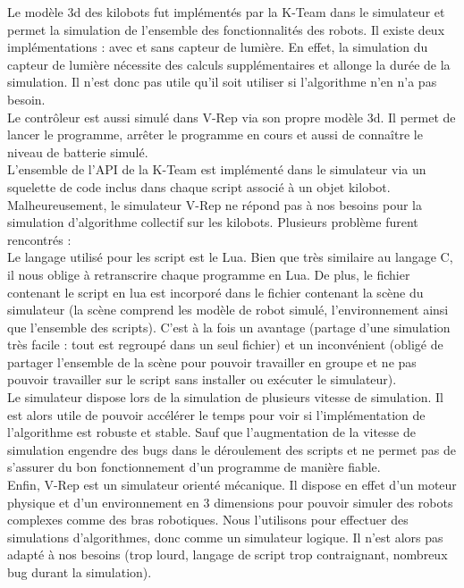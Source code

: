 \documentclass[a4paper,8pt]{report}
\begin{document}
\medskip
Le mod\`ele 3d des kilobots fut impl\'ement\'es par la K-Team dans le simulateur et permet la simulation de l'ensemble des fonctionnalit\'es des robots. Il existe deux impl\'ementations : avec et sans capteur de lumi\`ere. En effet, la simulation du capteur de lumi\`ere n\'ecessite des calculs suppl\'ementaires et allonge la dur\'ee de la simulation. Il n'est donc pas utile qu'il soit utiliser si l'algorithme n'en n'a pas besoin. \\
Le contr\^oleur est aussi simul\'e dans V-Rep via son propre mod\`ele 3d. Il permet de lancer le programme, arr\^eter le programme en cours et aussi de conna\^itre le niveau de batterie simul\'e. \\
L'ensemble de l'API de la K-Team est impl\'ement\'e dans le simulateur via un squelette de code inclus dans chaque script associ\'e \`a un objet kilobot.\\

\medskip
Malheureusement, le simulateur V-Rep ne r\'epond pas \`a nos besoins pour la simulation d'algorithme collectif sur les kilobots. Plusieurs probl\`eme furent rencontr\'es : \\ 

\medskip
Le langage utilis\'e pour les script est le Lua. Bien que tr\`es similaire au langage C, il nous oblige \`a retranscrire chaque programme en Lua. De plus, le fichier contenant le script en lua est incorpor\'e dans le fichier contenant la sc\`ene du simulateur (la sc\`ene comprend les mod\`ele de robot simul\'e, l'environnement ainsi que l'ensemble des scripts). C'est \`a la fois un avantage (partage d'une simulation tr\`es facile : tout est regroup\'e dans un seul fichier) et un inconv\'enient (oblig\'e de partager l'ensemble de la sc\`ene pour pouvoir travailler en groupe et ne pas pouvoir travailler sur le script sans installer ou ex\'ecuter le simulateur).\\

\medskip
Le simulateur dispose lors de la simulation de plusieurs vitesse de simulation. Il est alors utile de pouvoir acc\'el\'erer le temps pour voir si l'impl\'ementation de l'algorithme est robuste et stable. Sauf que l'augmentation de la vitesse de simulation engendre des bugs dans le d\'eroulement des scripts et ne permet pas de s'assurer du bon fonctionnement d'un programme de mani\`ere fiable.\\

\medskip
Enfin, V-Rep est un simulateur orient\'e m\'ecanique. Il dispose en effet d'un moteur physique et d'un environnement en 3 dimensions pour pouvoir simuler des robots complexes comme des bras robotiques. Nous l'utilisons pour effectuer des simulations d'algorithmes, donc comme un simulateur logique. Il n'est alors pas adapt\'e \`a nos besoins (trop lourd, langage de script trop contraignant, nombreux bug durant la simulation).\\
\end{document}
